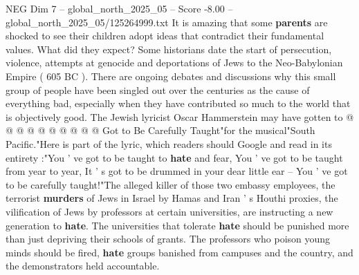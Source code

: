 \begin{textsample}{NEG Dim 7 – global\_north\_2025\_05 – Score -8.00 – global\_north\_2025\_05/125264999.txt}
It is amazing that some \textbf{parents} are shocked to see their children adopt ideas that contradict their fundamental values.
What did they expect?
Some historians date the start of persecution, violence, attempts at genocide and deportations of Jews to the Neo-Babylonian Empire ( 605 BC ).
There are ongoing debates and discussions why this small group of people have been singled out over the centuries as the cause of everything bad, especially when they have contributed so much to the world that is objectively good.
The Jewish lyricist Oscar Hammerstein may have gotten to @ @ @ @ @ @ @ @ @ @ Got to Be Carefully Taught"for the musical"South Pacific."Here is part of the lyric, which readers should Google and read in its entirety :"You ' ve got to be taught to \textbf{hate} and fear, You ' ve got to be taught from year to year, It ' s got to be drummed in your dear little ear -- You ' ve got to be carefully taught!"The alleged killer of those two embassy employees, the terrorist \textbf{murders} of Jews in Israel by Hamas and Iran ' s Houthi proxies, the vilification of Jews by professors at certain universities, are instructing a new generation to \textbf{hate}.
The universities that tolerate \textbf{hate} should be punished more than just depriving their schools of grants.
The professors who poison young minds should be fired, \textbf{hate} groups banished from campuses and the country, and the demonstrators held accountable.

\end{textsample}
